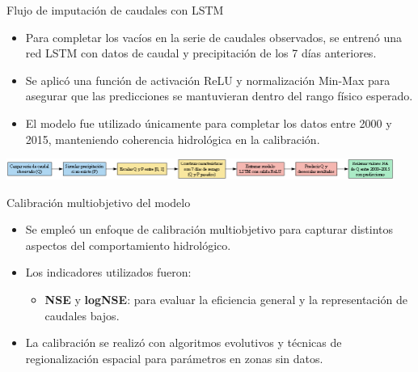 \documentclass{beamer}
\begin{document}
\begin{frame}{Flujo de imputación de caudales con LSTM}
  \small
  \begin{itemize}
    \item Para completar los vacíos en la serie de caudales observados, se entrenó una red LSTM con datos de caudal y precipitación de los 7 días anteriores.
    \item Se aplicó una función de activación ReLU y normalización Min-Max para asegurar que las predicciones se mantuvieran dentro del rango físico esperado.
    \item El modelo fue utilizado únicamente para completar los datos entre 2000 y 2015, manteniendo coherencia hidrológica en la calibración.
  \end{itemize}
  \vspace{0.4cm}
  \begin{center}
    \includegraphics[width=0.95\textwidth]{flujo_lstm_qfill_300dpi.png}
  \end{center}
\end{frame}

\begin{frame}{Calibración multiobjetivo del modelo}
  \small
  \begin{itemize}
    \item Se empleó un enfoque de calibración multiobjetivo para capturar distintos aspectos del comportamiento hidrológico.
    \item Los indicadores utilizados fueron:
    \begin{itemize}
      \item \textbf{NSE} y \textbf{logNSE}: para evaluar la eficiencia general y la representación de caudales bajos.
    \end{itemize}
    \item La calibración se realizó con algoritmos evolutivos y técnicas de regionalización espacial para parámetros en zonas sin datos.
  \end{itemize}
  \vspace{0.4cm}
\end{frame}
\end{document}
